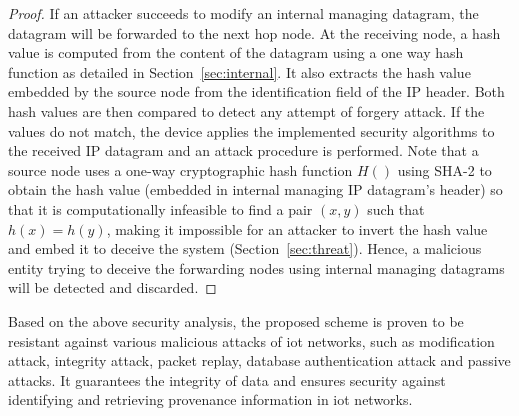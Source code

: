 \documentclass{llncs}
\begin{document}
\begin{proof}
If an attacker succeeds to modify an internal managing datagram, the datagram will be forwarded to the next hop node. At the receiving node, a hash value is computed from the content of the datagram using a one way hash function as detailed in Section~\ref{sec:internal}. It also extracts the hash value embedded by the source node from the identification field of the IP header. Both hash values are then compared to detect any attempt of forgery attack. If the values do not match, the device applies the implemented security algorithms to the received IP datagram and an attack procedure is performed. Note that a source node uses a one-way cryptographic hash function $H()$ using SHA-2 to obtain the hash value (embedded in internal managing IP datagram's  header) so that it is computationally infeasible to find a pair $(x,y)$ such that $h(x) = h(y)$, making it impossible for an attacker to invert the hash value and embed it to deceive the system (Section~\ref{sec:threat}). Hence, a malicious entity trying to deceive the forwarding nodes using internal managing datagrams will be detected and discarded.
\end{proof}

Based on the above security analysis, the proposed scheme is proven to be resistant against various malicious attacks of \gls*{iot} networks, such as modification attack, integrity attack, packet replay, database authentication attack and passive attacks. It guarantees the integrity of data and ensures security against identifying and retrieving provenance information in \gls*{iot} networks. 
\end{document}
